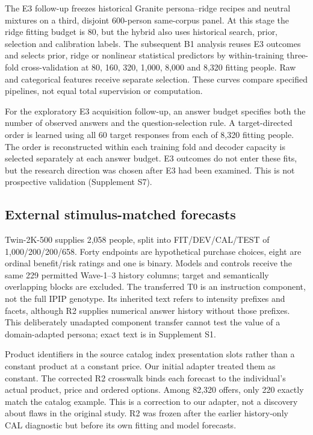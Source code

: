 \documentclass[11pt]{article}
\begin{document}
The E3 follow-up freezes historical Granite persona--ridge recipes and neutral mixtures on a third, disjoint 600-person same-corpus panel. At this stage the ridge fitting budget is 80, but the hybrid also uses historical search, prior, selection and calibration labels. The subsequent B1 analysis reuses E3 outcomes and selects prior, ridge or nonlinear statistical predictors by within-training three-fold cross-validation at 80, 160, 320, 1,000, 8,000 and 8,320 fitting people. Raw and categorical features receive separate selection. These curves compare specified pipelines, not equal total supervision or computation.

For the exploratory E3 acquisition follow-up, an answer budget specifies both the number of observed answers and the question-selection rule. A target-directed order is learned using all 60 target responses from each of 8,320 fitting people. The order is reconstructed within each training fold and decoder capacity is selected separately at each answer budget. E3 outcomes do not enter these fits, but the research direction was chosen after E3 had been examined. This is not prospective validation (Supplement S7).

\subsection{External stimulus-matched forecasts}
Twin-2K-500 supplies 2,058 people, split into FIT/DEV/CAL/TEST of 1,000/200/200/658. Forty endpoints are hypothetical purchase choices, eight are ordinal benefit/risk ratings and one is binary. Models and controls receive the same 229 permitted Wave-1--3 history columns; target and semantically overlapping blocks are excluded. The transferred T0 is an instruction component, not the full IPIP genotype. Its inherited text refers to intensity prefixes and facets, although R2 supplies numerical answer history without those prefixes. This deliberately unadapted component transfer cannot test the value of a domain-adapted persona; exact text is in Supplement S1.

Product identifiers in the source catalog index presentation slots rather than a constant product at a constant price. Our initial adapter treated them as constant. The corrected R2 crosswalk binds each forecast to the individual's actual product, price and ordered options. Among 82,320 offers, only 220 exactly match the catalog example. This is a correction to our adapter, not a discovery about flaws in the original study. R2 was frozen after the earlier history-only CAL diagnostic but before its own fitting and model forecasts.
\end{document}
